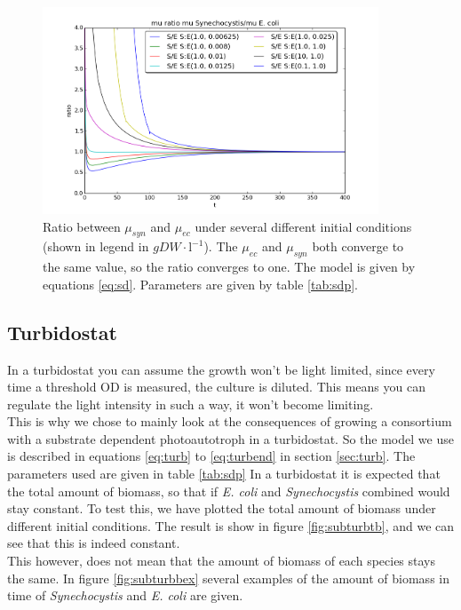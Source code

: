 \documentclass[12pt]{report}
\begin{document}
\begin{figure}[!ht]
 \begin{center}  
     \includegraphics[width=10cm]{ratios_interdependent_muratio.png}
     \caption{Ratio between $\mu_{syn}$ and $\mu_{ec}$ under several different initial conditions (shown in legend in $gDW\cdot \text{l}^{-1}$). The $\mu_{ec}$ and $\mu_{syn}$ both converge to the same value, so the ratio converges to one. The model is given by equations \ref{eq:sd}. Parameters are given by table \ref{tab:sdp}.}
    \label{fig:submurat}
    \end{center}
\end{figure}

\pagebreak
\newpage

\subsection{Turbidostat}
In a turbidostat you can assume the growth won't be light limited, since every time a threshold OD is measured, the culture is diluted. This means you can regulate the light intensity in such a way, it won't become limiting.\\
This is why we chose to mainly look at the consequences of growing a consortium with a substrate dependent photoautotroph in a turbidostat. So the model we use is described in equations \ref{eq:turb} to \ref{eq:turbend} in section \ref{sec:turb}. The parameters used are given in table \ref{tab:sdp}
In a turbidostat it is expected that the total amount of biomass, so that if \textit{E. coli} and \textit{Synechocystis} combined would stay constant. To test this, we have plotted the total amount of biomass under different initial conditions. The result is show in figure \ref{fig:subturbtb}, and we can see that this is indeed constant. \\
This however, does not mean that the amount of biomass of each species stays the same. In figure \ref{fig:subturbbex} several examples of the amount of biomass in time of \textit{Synechocystis} and \textit{E. coli} are given.
\end{document}
